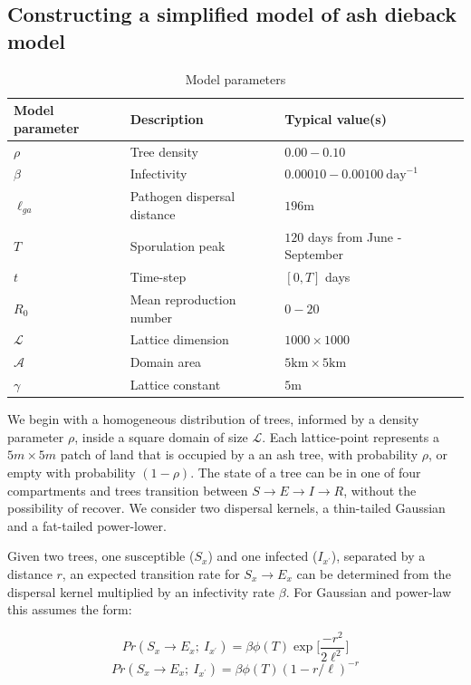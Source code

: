  


\subsection{Constructing a simplified model of ash dieback model}

\begin{table}[h]
\centering
\begin{tabular}{l l l}
\hline
\textbf{Model parameter} & \textbf{Description} & \textbf{Typical value(s)}\\
\hline
$\rho$  & Tree density & $0.00 - 0.10$ \\ 
$\beta$ & Infectivity & $0.00010 - 0.00100\ \mathrm{day}^{-1}$ \\
$\ell_{ga}$ & Pathogen dispersal distance & $196\mathrm{m}$ \\
$T$ & Sporulation peak & $120$ days from June - September \\
$t$ & Time-step & $[0, T]$ days\\
$R_0$ & Mean reproduction number & $0-20$ \\
$\mathcal{L}$ & Lattice dimension & $1000\times1000$ \\
$\mathcal{A}$ & Domain area & $5\mathrm{km}\times5\mathrm{km}$ \\
$\gamma$ & Lattice constant & $5\mathrm{m}$ \\
\hline
\end{tabular}
\caption{Model parameters}
\end{table}


We begin with a homogeneous distribution of trees, informed by a density parameter $\rho$, inside a square domain of size $\mathcal{L}$. Each lattice-point represents a $5m\times5m$ patch of land that is occupied by a an ash tree, with probability $\rho$, or empty with probability $(1-\rho)$. The state of a tree can be in one of four compartments and trees transition between $S\rightarrow E \rightarrow I \rightarrow R$, without the possibility of recover. We consider two dispersal kernels, a thin-tailed Gaussian and a fat-tailed power-lower.

Given two trees, one susceptible ($S_x$) and one infected ($I_{x^\prime}$), separated by a distance $r$, an expected transition rate for $S_x \rightarrow E_x$ can be determined from the dispersal kernel multiplied by an infectivity rate $\beta$. For Gaussian and power-law this assumes the form:

\begin{equation}
    Pr(S_{x} \rightarrow E_{x} ;\ I_{x^{\prime}} ) = \beta  \phi(T) \exp\Big[\frac{-r^2}{2\ell^2}\Big] 
\end{equation}
\begin{equation}
    Pr(S_{x} \rightarrow E_{x} ;\ I_{x^{\prime}} ) = \beta \phi(T) (1 - r/\ell)^{-r}
\end{equation}

